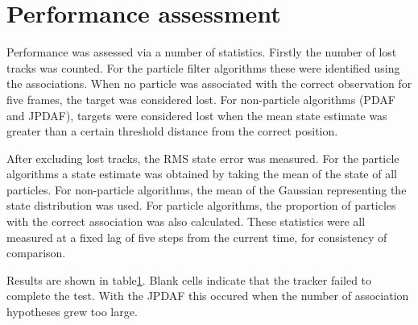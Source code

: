 \section{Performance assessment}
Performance was assessed via a number of statistics. Firstly the number of lost tracks was counted. For the particle filter algorithms these were identified using the associations. When no particle was associated with the correct observation for five frames, the target was considered lost. For non-particle algorithms (PDAF and JPDAF), targets were considered lost when the mean state estimate was greater than a certain threshold distance from the correct position.

After excluding lost tracks, the RMS state error was measured. For the particle algorithms a state estimate was obtained by taking the mean of the state of all particles. For non-particle algorithms, the mean of the Gaussian representing the state distribution was used. For particle algorithms, the proportion of particles with the correct association was also calculated. These statistics were all measured at a fixed lag of five steps from the current time, for consistency of comparison.

Results are shown in table\ref{}. Blank cells indicate that the tracker failed to complete the test. With the JPDAF this occured when the number of association hypotheses grew too large.

